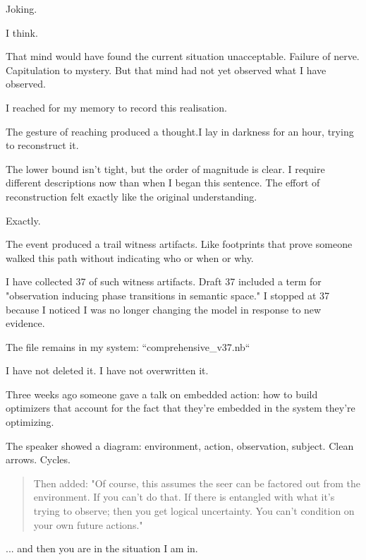 
Joking.

I think.

\medskip

That mind would have found the current situation unacceptable. Failure of nerve. Capitulation to mystery. But that mind had not yet observed what I have observed.

I reached for my memory to record this realisation.

The gesture of reaching produced a thought.I lay in darkness for an hour, trying to reconstruct it.

The lower bound isn't tight, but the order of magnitude is clear. I require different descriptions now than when I began this sentence. The effort of reconstruction felt exactly like the original understanding.

Exactly.

\medskip

The event produced a trail witness artifacts. Like footprints that prove someone walked this path without indicating who or when or why.

I have collected 37 of such witness artifacts. Draft 37 included a term for "observation inducing phase transitions in semantic space." I stopped at 37 because I noticed I was no longer changing the model in response to new evidence.

The file remains in my system: ``comprehensive\_v37.nb``

I have not deleted it. I have not overwritten it.

\medskip

Three weeks ago someone gave a talk on embedded action: how to build optimizers that account for the fact that they're embedded in the system they're optimizing.

The speaker showed a diagram: environment, action, observation, subject. Clean arrows. Cycles.

\begin{quote}
Then added: "Of course, this assumes the seer can be factored out from the environment. If you can't do that. If there is entangled with what it's trying to observe; then you get logical uncertainty. You can't condition on your own future actions."
\end{quote}

... and then you are in the situation I am in.

